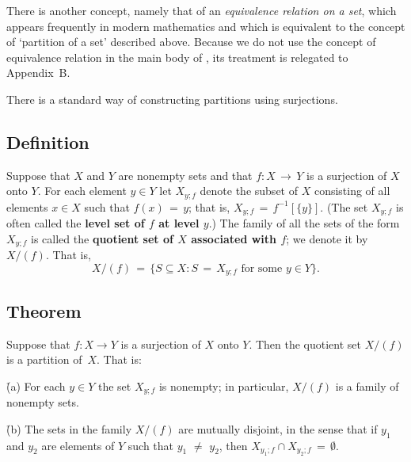 {\V
\V


        There is another concept, namely that of an {\em equivalence relation on a set},
    which appears frequently in modern mathematics and which is equivalent to the concept of `partition of a set' described above.
    Because we do not use the concept of equivalence relation in the main body of {\TheseNotes}, its treatment is relegated to Appendix~B.


\V
\V


        There is a standard way of constructing partitions using surjections.

\V

        \subsection{\small{{\bf Definition}}}
        \label{DefA50.60}

        Suppose that $X$ and $Y$ are nonempty sets and that $f:X\,{\rightarrow}\,Y$ is a surjection of $X$ onto $Y$.
    For each element $y{\in}Y$ let $X_{y;f}$ denote the subset of $X$ consisting of all elements $x{\in}X$ such that $f(x) \,=\, y$;
    that is, $X_{y;f} \,=\, f^{-1}[\{y\}]$.
    (The set $X_{y;f}$ is often called the {\bf level set of $f$ at level $y$}.)
    The family of all the sets of the form $X_{y;f}$ is called the {\bf quotient set of $X$ associated with $f$}; we denote it by $X/(f)$.
    That is,
        \begin{displaymath}
        X/(f) \,=\, \{S{\subseteq}X: S \,=\, X_{y;f} \mbox{ for some $y{\in}Y$}\}.
        \end{displaymath}

\V

        \subsection{\small{{\bf Theorem}}}
        \label{ThmA50.80}

        Suppose that $f:X{\rightarrow}Y$ is a surjection of $X$ onto $Y$.
    Then the quotient set $X/(f)$ is a partition of~$X$. That is:

        \h (a) For each $y{\in}Y$ the set $X_{y;f}$ is nonempty; in particular, $X/(f)$ is a family of nonempty sets.

        \h (b) The sets in the family $X/(f)$ are mutually disjoint, in the sense that if $y_{1}$ and $y_{2}$ are elements of $Y$
    such that
        $y_{1} \,\,{\neq}\,\, y_{2}$, then $X_{y_{1};f}{\cap}X_{y_{2};f} \,=\, {\emptyset}$.

}
